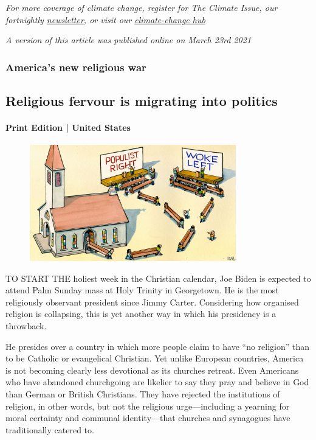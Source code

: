 \documentclass{article}
\begin{document}
\emph{For more coverage of climate change, register for The Climate Issue, our fortnightly \href{/theclimateissue/}{newsletter}, or visit our \href{/news/2020/04/24/the-economists-coverage-of-climate-change}{climate-change hub}} 

\emph{A version of this article was published online on March 23rd 2021} 
\clearpage
\subsubsection{America's new religious war }
\subsection{Religious fervour is migrating into politics }
\paragraph{Print Edition | United States  \quad \color{gray}{Mar 27th 2021 }}
\begin{figure}[h]
\centering
\includegraphics[width=0.8\textwidth]{images/20210327_USD000_0.jpg}
\end{figure}
\lettrine{T}O START THE holiest week in the Christian calendar, Joe Biden is expected to attend Palm Sunday mass at Holy Trinity in Georgetown. He is the most religiously observant president since Jimmy Carter. Considering how organised religion is collapsing, this is yet another way in which his presidency is a throwback. 

He presides over a country in which more people claim to have ``no religion'' than to be Catholic or evangelical Christian. Yet unlike European countries, America is not becoming clearly less devotional as its churches retreat. Even Americans who have abandoned churchgoing are likelier to say they pray and believe in God than German or British Christians. They have rejected the institutions of religion, in other words, but not the religious urge---including a yearning for moral certainty and communal identity---that churches and synagogues have traditionally catered to. 
\end{document}
